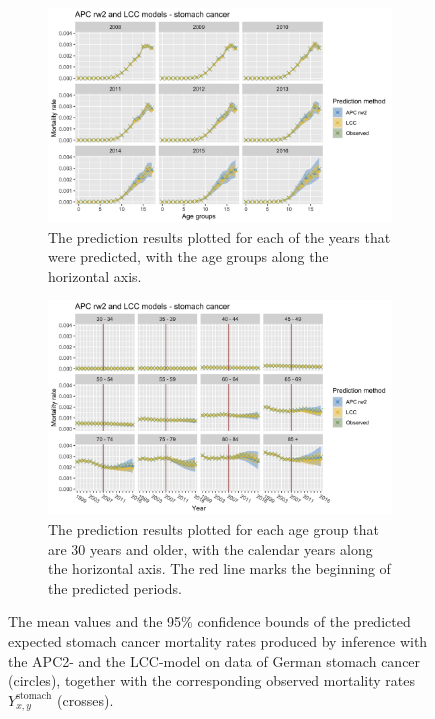 \begin{figure}
    \centering
    \begin{subfigure}[b]{.6\linewidth}
        \includegraphics[width=\linewidth]{real-data/real-data-univariate/Figures/univariate-comparison-by-age-stomach.png}
        \caption{The prediction results plotted for each of the years that were predicted, with the age groups along the horizontal axis.}
        \label{fig:uv-comparison-stomach-top}
    \end{subfigure}
    
    \begin{subfigure}[b]{.6\linewidth}
        \includegraphics[width=\linewidth]{real-data/real-data-univariate/Figures/univariate-comparison-by-period-stomach.png}
        \caption{The prediction results plotted for each age group that are 30 years and older, with the calendar years along the horizontal axis. The red line marks the beginning of the predicted periods.}
        \label{fig:uv-comparison-stomach-bottom}
    \end{subfigure}
    \caption{The mean values and the 95\% confidence bounds of the predicted expected stomach cancer mortality rates produced by inference with the APC2- and the LCC-model on data of German stomach cancer (circles), together with the corresponding observed mortality rates $Y_{x,y}^{\text{stomach}}$ (crosses).}
    \label{fig:uv-comparison-stomach}
\end{figure}

